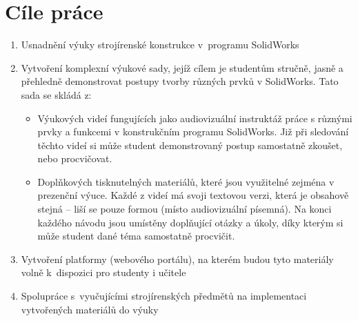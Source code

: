 \chapter{Cíle práce}

\begin{enumerate}[topsep=0pt]
    \setlength\itemsep{0em}
    \item Usnadnění výuky strojírenské konstrukce v~programu SolidWorks
    \item Vytvoření komplexní výukové sady, jejíž cílem je studentům stručně, jasně a přehledně demonstrovat postupy tvorby různých prvků v SolidWorks. Tato sada se skládá z:
    \begin{itemize}[topsep=0pt]
        \setlength\itemsep{0em}
        \item Výukových videí fungujících jako audiovizuální instruktáž práce s různými prvky a funkcemi v konstrukčním programu SolidWorks. Již při sledování těchto videí si může student demonstrovaný postup samostatně zkoušet, nebo procvičovat. 
        \item Doplňkových tisknutelných materiálů, které jsou využitelné zejména v prezenční výuce. Každé z videí má svoji textovou verzi, která je obsahově stejná -- liší se pouze formou (místo audiovizuální písemná). Na konci každého návodu jsou umístěny doplňující otázky a úkoly, díky kterým si může student dané téma samostatně procvičit.
    \end{itemize}
    \item Vytvoření platformy (webového portálu), na kterém budou tyto materiály volně k~dispozici pro studenty i učitele
    \item Spolupráce s~vyučujícími strojírenských předmětů na implementaci vytvořených materiálů do výuky
\end{enumerate}
